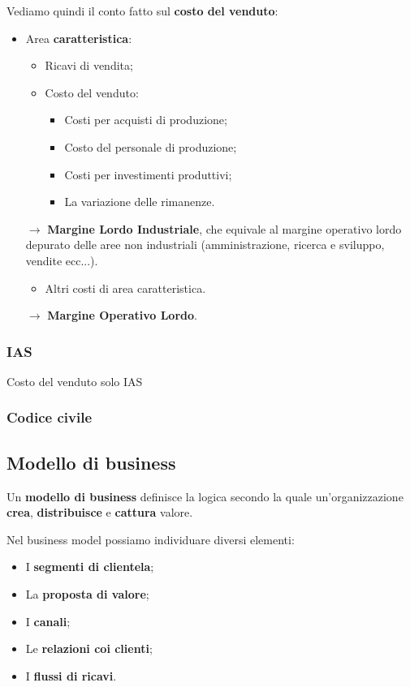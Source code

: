 \documentclass[a4paper,11pt]{article}
\begin{document}
Vediamo quindi il conto fatto sul \textbf{costo del venduto}:
\begin{itemize}
	\item Area \textbf{caratteristica}:
		\begin{itemize}
			\item Ricavi di vendita;
			\item Costo del venduto:
				\begin{itemize}
					\item Costi per acquisti di produzione;
					\item Costo del personale di produzione;
					\item Costi per investimenti produttivi;
					\item La variazione delle rimanenze.
				\end{itemize}
		\end{itemize}
		$\rightarrow$ \textbf{Margine Lordo Industriale}, che equivale al margine operativo lordo depurato delle aree non industriali (amministrazione, ricerca e sviluppo, vendite ecc...).
		\begin{itemize}
			\item Altri costi di area caratteristica.
		\end{itemize}
		$\rightarrow$ \textbf{Margine Operativo Lordo}.

\end{itemize}

\subsubsection{IAS}
Costo del venduto solo IAS

\subsubsection{Codice civile}

\subsection{Modello di business}
Un \textbf{modello di business} definisce la logica secondo la quale un'organizzazione \textbf{crea}, \textbf{distribuisce} e \textbf{cattura} valore.

Nel business model possiamo individuare diversi elementi:
\begin{itemize}
	\item I \textbf{segmenti di clientela};
	\item La \textbf{proposta di valore};
	\item I \textbf{canali};
	\item Le \textbf{relazioni coi clienti};
	\item I \textbf{flussi di ricavi}.
\end{itemize}
\end{document}
